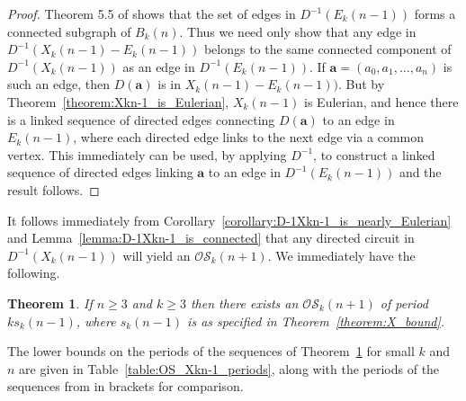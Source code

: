 \documentclass[a4paper,11pt]{article}
\theoremstyle{plain}
\newtheorem{theorem}[lemma]{Theorem}
\theoremstyle{definition}
\theoremstyle{remark}
\begin{document}
\begin{proof}
Theorem 5.5 of \cite{Mitchell26} shows that the set of edges in $D^{-1}(E_k(n-1))$ forms a
connected subgraph of $B_k(n)$.  Thus we need only show that any edge in
$D^{-1}(X_k(n-1)-E_k(n-1))$ belongs to the same connected component of $D^{-1}(X_k(n-1))$ as an
edge in $D^{-1}(E_k(n-1))$.  If $\mathbf{a}=(a_0,a_1,\dots,a_n)$ is such an edge, then
$D(\mathbf{a})$ is in $X_k(n-1)-E_k(n-1))$. But by Theorem~\ref{theorem:Xkn-1_is_Eulerian},
$X_k(n-1)$ is Eulerian, and hence there is a linked sequence of directed edges connecting
$D(\mathbf{a})$ to an edge in $E_k(n-1)$, where each directed edge links to the next edge via a
common vertex. This immediately can be used, by applying $D^{-1}$, to construct a linked sequence
of directed edges linking $\mathbf{a}$ to an edge in $D^{-1}(E_k(n-1))$ and the result follows.
\end{proof}

It follows immediately from Corollary~\ref{corollary:D-1Xkn-1_is_nearly_Eulerian} and
Lemma~\ref{lemma:D-1Xkn-1_is_connected} that any directed circuit in $D^{-1}(X_k(n-1))$ will yield
an $\mathcal{OS}_k(n+1)$. We immediately have the following.

\begin{theorem} \label{theorem:new_OS_lower_bounds}
If $n\geq3$ and $k\geq3$ then there exists an $\mathcal{OS}_k(n+1)$ of period $ks_k(n-1)$, where
$s_k(n-1)$ is as specified in Theorem~\ref{theorem:X_bound}.
\end{theorem}

The lower bounds on the periods of the sequences of Theorem~\ref{theorem:new_OS_lower_bounds} for
small $k$ and $n$ are given in Table~\ref{table:OS_Xkn-1_periods}, along with the periods of the
sequences from \cite[Table 5]{Mitchell26} in brackets for comparison.
\end{document}
